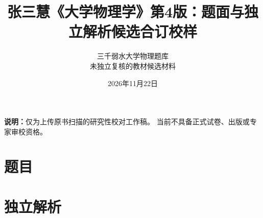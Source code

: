 \documentclass[UTF8,a4paper,11pt]{ctexart}
\title{张三慧《大学物理学》第4版：题面与独立解析候选合订校样}
\author{三千弱水大学物理题库\\未独立复核的教材候选材料}
\date{2026年11月22日}
\begin{document}
\maketitle
\noindent\textbf{说明：}仅为上传原书扫描的研究性校对工作稿。
当前不具备正式试卷、出版或专家审校资格。
\tableofcontents
\clearpage
\part*{题目}






























\clearpage
\part*{独立解析}






























\end{document}
